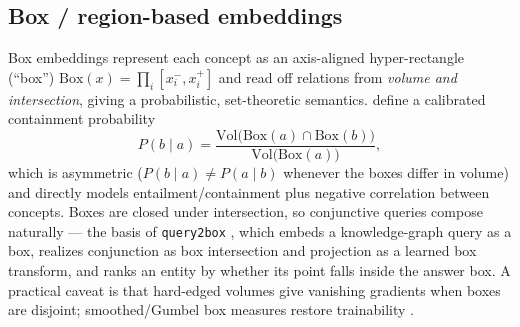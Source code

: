 \subsection{Box / region-based embeddings}
Box embeddings represent each concept as an axis-aligned hyper-rectangle
(``box'') $\mathrm{Box}(x) = \prod_i [x_i^{-}, x_i^{+}]$ and read off relations
from \emph{volume and intersection}, giving a probabilistic, set-theoretic
semantics. \citet{geo:vilnis2018box} define a calibrated containment
probability
\begin{equation}
P(b \mid a) = \frac{\mathrm{Vol}\big(\mathrm{Box}(a)\cap
\mathrm{Box}(b)\big)}{\mathrm{Vol}\big(\mathrm{Box}(a)\big)},
\end{equation}
which is asymmetric ($P(b\mid a)\neq P(a\mid b)$ whenever the boxes differ in
volume) and directly models entailment/containment plus negative correlation
between concepts. Boxes are closed under intersection, so conjunctive queries
compose naturally --- the basis of \texttt{query2box}
\citep{geo:ren2020query2box}, which embeds a knowledge-graph query as a box,
realizes conjunction as box intersection and projection as a learned box
transform, and ranks an entity by whether its point falls inside the answer
box. A practical caveat is that hard-edged volumes give vanishing gradients
when boxes are disjoint; smoothed/Gumbel box measures restore
trainability \citep{geo:dasgupta2020boxlib}.

